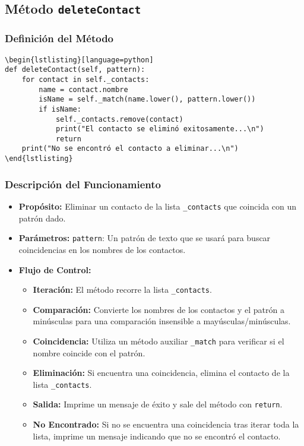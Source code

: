 \subsection{Método \texttt{deleteContact}}
\subsubsection{Definición del Método}
\begin{verbatim}
\begin{lstlisting}[language=python]
def deleteContact(self, pattern):
    for contact in self._contacts:
        name = contact.nombre
        isName = self._match(name.lower(), pattern.lower())
        if isName:
            self._contacts.remove(contact)
            print("El contacto se eliminó exitosamente...\n")
            return
    print("No se encontró el contacto a eliminar...\n")
\end{lstlisting}
\end{verbatim}

\subsubsection{Descripción del Funcionamiento}
\begin{itemize}
    \item \textbf{Propósito:}
    Eliminar un contacto de la lista \texttt{\_contacts} que coincida con un patrón dado.
    \item \textbf{Parámetros:}
    \texttt{pattern}: Un patrón de texto que se usará para buscar coincidencias en los nombres de los contactos.
    \item \textbf{Flujo de Control:}
    \begin{itemize}
        \item \textbf{Iteración:} El método recorre la lista \texttt{\_contacts}.
        \item \textbf{Comparación:} Convierte los nombres de los contactos y el patrón a minúsculas para una comparación insensible a mayúsculas/minúsculas.
        \item \textbf{Coincidencia:} Utiliza un método auxiliar \texttt{\_match} para verificar si el nombre coincide con el patrón.
        \item \textbf{Eliminación:} Si encuentra una coincidencia, elimina el contacto de la lista \texttt{\_contacts}.
        \item \textbf{Salida:} Imprime un mensaje de éxito y sale del método con \texttt{return}.
        \item \textbf{No Encontrado:} Si no se encuentra una coincidencia tras iterar toda la lista, imprime un mensaje indicando que no se encontró el contacto.
    \end{itemize}
\end{itemize}